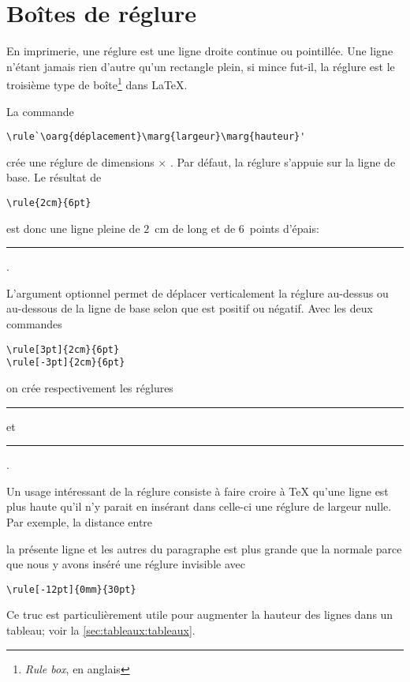 
\section{Boîtes de réglure}
\label{sec:boites:rulebox}

En imprimerie, une réglure est une ligne droite continue ou
pointillée. Une ligne n'étant jamais rien d'autre qu'un rectangle
plein, si mince fut-il, la réglure est le troisième type de
boîte\footnote{%
  \emph{Rule box}, en anglais} %
dans {\LaTeX}.

La commande
\begin{lstlisting}
\rule`\oarg{déplacement}\marg{largeur}\marg{hauteur}'
\end{lstlisting}
crée une réglure de dimensions  $\times$ .
Par défaut, la réglure s'appuie sur la ligne de base. Le résultat de
\begin{lstlisting}
\rule{2cm}{6pt}
\end{lstlisting}
est donc une ligne pleine de $2$~cm de long et de $6$~points d'épais:
\rule{2cm}{6pt}.

L'argument optionnel  permet de déplacer
verticalement la réglure au-dessus ou au-dessous de la ligne de base
selon que  est positif ou négatif. Avec les deux
commandes
\begin{lstlisting}
\rule[3pt]{2cm}{6pt}
\rule[-3pt]{2cm}{6pt}
\end{lstlisting}
on crée respectivement les réglures \rule[3pt]{2cm}{6pt} et
\rule[-3pt]{2cm}{6pt}.

Un usage intéressant de la réglure consiste à faire croire à {\TeX}
qu'une ligne est plus haute qu'il n'y parait en insérant dans celle-ci
une réglure de largeur nulle. Par exemple, la distance entre
\rule[-12pt]{0mm}{30pt}\relax la présente ligne et les autres du paragraphe est
plus grande que la normale parce que nous y avons inséré une réglure
invisible avec
\begin{lstlisting}
\rule[-12pt]{0mm}{30pt}
\end{lstlisting}
Ce truc est particulièrement utile pour augmenter la hauteur des
lignes dans un tableau; voir la \autoref{sec:tableaux:tableaux}.


